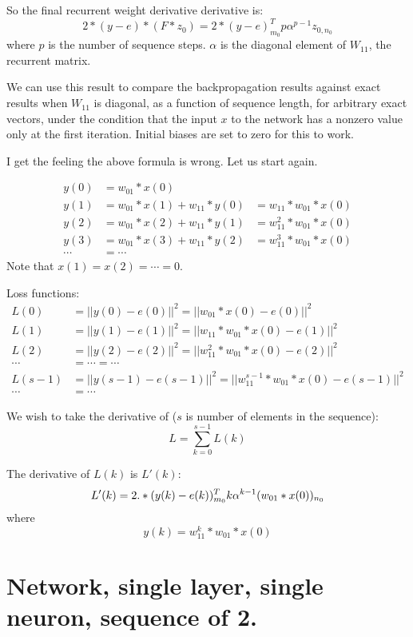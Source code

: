 \documentclass[11pt]{article}
\begin{document}
So the final recurrent weight derivative derivative is: 
$$
2*(y-e) * (F*z_0) = 2*(y-e)^T_{m_0} p \alpha^{p-1} z_{0,n_0}
$$
where $p$ is the number of sequence steps. $\alpha$ is the diagonal element of $W_{11}$, the recurrent matrix. 

We can use this result to compare the backpropagation results against exact results when $W_{11}$ is diagonal, as a function 
of sequence length, for arbitrary exact vectors, under the condition that the input $x$ to the network has a nonzero value
only at the first iteration. Initial biases are set to zero for this to work. 

I get the feeling the above formula is wrong. Let us start again. 

\begin{align}
y(0) &= w_{01}*x(0)  \\
y(1) &= w_{01}*x(1) + w_{11}*y(0) &= w_{11}*w_{01}*x(0) \\
y(2) &= w_{01}*x(2) + w_{11}*y(1) &= w_{11}^2*w_{01}*x(0)\\
y(3) &= w_{01}*x(3) + w_{11}*y(2) &= w_{11}^3*w_{01}*x(0)\\
\cdots &= \cdots 
\end{align}
Note that $x(1) = x(2) = \cdots = 0$. 

Loss functions: 
\begin{align}
L(0) &= ||y(0) - e(0)||^2 = ||w_{01}*x(0)-e(0)||^2\\
L(1) &= ||y(1) - e(1)||^2 = ||w_{11}*w_{01}*x(0) - e(1)||^2 \\
L(2) &= ||y(2) - e(2)||^2 = ||w_{11}^2*w_{01}*x(0) - e(2)||^2 \\
\cdots &= \cdots = \cdots \\
L(s-1) &= ||y(s-1) - e(s-1)||^2 = ||w_{11}^{s-1}*w_{01}*x(0) - e(s-1)||^2 \\
\cdots &= \cdots 
\end{align}

We wish to take the derivative of  ($s$ is number of elements in the sequence): 
$$
L = \sum_{k=0}^{s-1} L(k)
$$

The derivative of $L(k)$ is $L'(k)$: 
$$
L'(k) = 2.*(y(k)-e(k))^T_{m_0} k \alpha^{k-1} (w_{01}*x(0))_{n_0} \\
$$
where 
$$
y(k) = w_{11}^k * w_{01}*x(0)
$$

\section{Network, single layer, single neuron, sequence of 2.}
\end{document}
